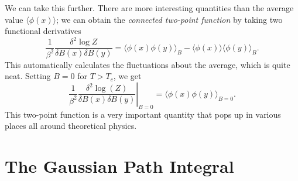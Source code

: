 We can take this further. There are more interesting quantities than the average value $\langle \phi(x) \rangle$; we can obtain the \emph{connected two-point function} by taking two functional derivatives
\begin{equation}
  \frac{1}{\beta^2} \frac{\delta^2 \log Z}{\delta B(x) \delta B(y)} = \langle \phi(x)\phi(y) \rangle_B - \langle \phi(x) \rangle \langle \phi(y) \rangle_B.
\end{equation}
This automatically calculates the fluctuations about the average, which is quite neat.
Setting $B = 0$ for $T > T_c$, we get
\begin{equation}
  \frac{1}{\beta^2} \left.\frac{\delta^2 \log(Z)}{\delta B(x) \delta B(y)} \right\rvert_{B=0} = \langle \phi(x) \phi(y) \rangle_{B = 0}.
\end{equation}
This two-point function is a very important quantity that pops up in various places all around theoretical physics.
\section{The Gaussian Path Integral}%
\label{sec:the_gaussian_path_integral}

